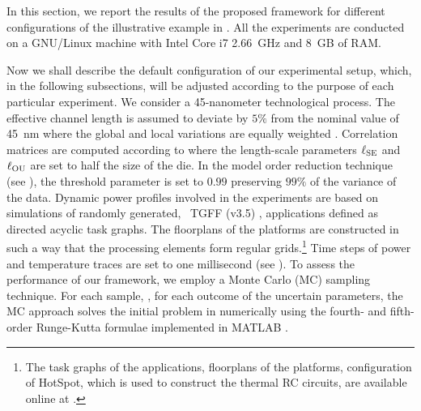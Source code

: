 In this section, we report the results of the proposed framework for different configurations of the illustrative example in .
All the experiments are conducted on a GNU/Linux machine with Intel Core i7 2.66~GHz and 8~GB of RAM.

Now we shall describe the default configuration of our experimental setup, which, in the following subsections, will be adjusted according to the purpose of each particular experiment.
We consider a 45-nanometer technological process.
The effective channel length is assumed to deviate by $5\%$ from the nominal value of 45~nm where the global and local variations are equally weighted \cite{juan2011, juan2012}.
Correlation matrices are computed according to  where the length-scale parameters $\ell_{\text{SE}}$ and $\ell_{\text{OU}}$ are set to half the size of the die.
In the model order reduction technique (see ), the threshold parameter is set to $0.99$ preserving $99\%$ of the variance of the data.
Dynamic power profiles involved in the experiments are based on simulations of randomly generated, \via\ TGFF (v3.5) \cite{dick1998}, applications defined as directed acyclic task graphs.
The floorplans of the platforms are constructed in such a way that the processing elements form regular grids.\footnote{The task graphs of the applications, floorplans of the platforms, configuration of HotSpot, which is used to construct the thermal RC circuits, are available online at \cite{sources}.}
Time steps of power and temperature traces are set to one millisecond (see ).
To assess the performance of our framework, we employ a Monte Carlo (MC) sampling technique.
For each sample, \ie, for each outcome of the uncertain parameters, the MC approach solves the initial problem in  numerically using the fourth- and fifth-order Runge-Kutta formulae \cite{press2007} implemented in MATLAB \cite{matlab}.

